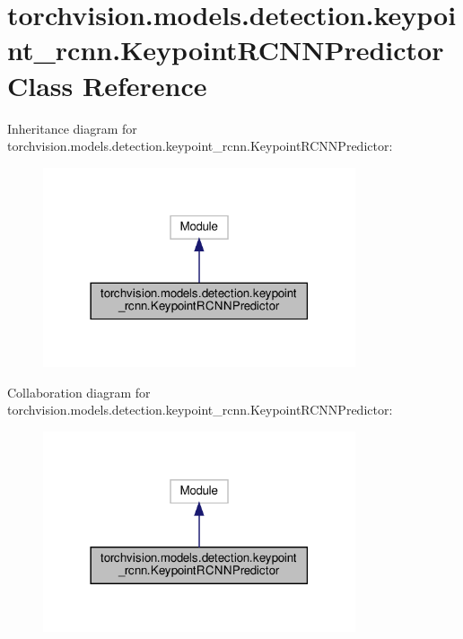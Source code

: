 \hypertarget{classtorchvision_1_1models_1_1detection_1_1keypoint__rcnn_1_1KeypointRCNNPredictor}{}\section{torchvision.\+models.\+detection.\+keypoint\+\_\+rcnn.\+Keypoint\+R\+C\+N\+N\+Predictor Class Reference}
\label{classtorchvision_1_1models_1_1detection_1_1keypoint__rcnn_1_1KeypointRCNNPredictor}


Inheritance diagram for torchvision.\+models.\+detection.\+keypoint\+\_\+rcnn.\+Keypoint\+R\+C\+N\+N\+Predictor\+:
\nopagebreak
\begin{figure}[H]
\begin{center}
\leavevmode
\includegraphics[width=261pt]{classtorchvision_1_1models_1_1detection_1_1keypoint__rcnn_1_1KeypointRCNNPredictor__inherit__graph}
\end{center}
\end{figure}


Collaboration diagram for torchvision.\+models.\+detection.\+keypoint\+\_\+rcnn.\+Keypoint\+R\+C\+N\+N\+Predictor\+:
\nopagebreak
\begin{figure}[H]
\begin{center}
\leavevmode
\includegraphics[width=261pt]{classtorchvision_1_1models_1_1detection_1_1keypoint__rcnn_1_1KeypointRCNNPredictor__coll__graph}
\end{center}
\end{figure}
